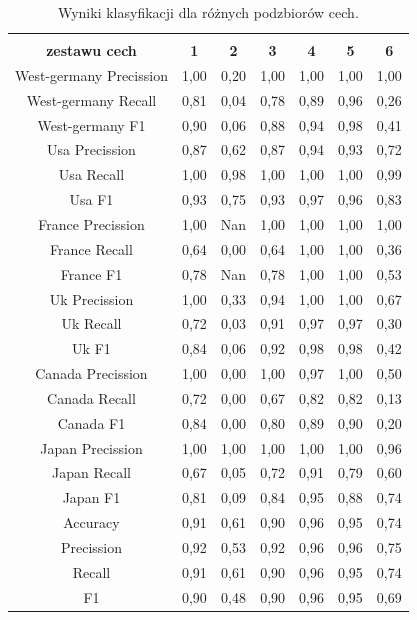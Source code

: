 \documentclass{classrep}
\begin{document}
\newpage
\begin{table}[h!]
\caption{Wyniki klasyfikacji dla różnych podzbiorów cech.}
\centering
\vspace{0.1cm}
 \begin{tabular}{c c c c c c c}

    \makecell{\textbf{Wyrbany numer} \\\textbf{zestawu cech}} & \textbf{1} & \textbf{2}  & \textbf{3}  & \textbf{4}  & \textbf{5} & \textbf{6}\\

\hline
West-germany Precission 	& 1,00 & 0,20 & 1,00 & 1,00 & 1,00 & 1,00\\
West-germany Recall 		& 0,81 & 0,04 & 0,78 & 0,89 & 0,96 & 0,26\\
West-germany F1		& 0,90 & 0,06 & 0,88 & 0,94 & 0,98 & 0,41\\
\hline
Usa Precission 			& 0,87 & 0,62 & 0,87 & 0,94 & 0,93 & 0,72\\
Usa Recall				& 1,00 & 0,98 & 1,00 & 1,00 & 1,00 & 0,99\\
Usa F1			 	& 0,93 & 0,75 & 0,93 & 0,97 & 0,96 & 0,83\\
\hline
France Precission 		& 1,00 & Nan & 1,00 & 1,00 & 1,00 & 1,00\\
France Recall 			& 0,64 & 0,00 & 0,64 & 1,00 & 1,00 & 0,36\\
France F1 				& 0,78 & Nan & 0,78 & 1,00 & 1,00 & 0,53\\
\hline
Uk Precission 			& 1,00 & 0,33 & 0,94 & 1,00 & 1,00 & 0,67\\
Uk Recall 				& 0,72 & 0,03 & 0,91 & 0,97 & 0,97 & 0,30\\
Uk F1 				& 0,84 & 0,06 & 0,92 & 0,98 & 0,98 & 0,42\\
\hline
Canada Precission		& 1,00 & 0,00 & 1,00 & 0,97 & 1,00 & 0,50\\
Canada Recall 			& 0,72 & 0,00 & 0,67 & 0,82 & 0,82 & 0,13\\
Canada F1 			& 0,84 & 0,00 & 0,80 & 0,89 & 0,90 & 0,20\\
\hline
Japan Precission 		& 1,00 & 1,00 & 1,00 & 1,00 & 1,00 & 0,96\\
Japan Recall 			& 0,67 & 0,05 & 0,72 & 0,91 & 0,79 & 0,60\\
Japan F1 				& 0,81 & 0,09 & 0,84 & 0,95 & 0,88 & 0,74\\
\hline
Accuracy 				& 0,91 & 0,61 & 0,90 & 0,96 & 0,95 & 0,74\\
Precission 				& 0,92 & 0,53 & 0,92 & 0,96 & 0,96 & 0,75\\
Recall 				& 0,91 & 0,61 & 0,90 & 0,96 & 0,95 & 0,74\\
F1 					& 0,90 & 0,48 & 0,90 & 0,96 & 0,95 & 0,69\\

\end {tabular}
\label {Wyniki klasyfikacji dla różnych podzbiorów cech.}
\end{table}
\end{document}
